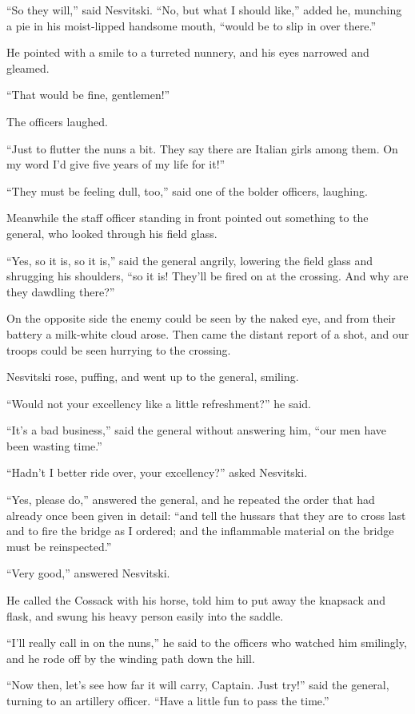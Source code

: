 ``So they will,'' said Nesvitski. ``No, but what I should like,''
added he, munching a pie in his moist-lipped handsome mouth,
``would be to slip in over there.''

He pointed with a smile to a turreted nunnery, and his eyes
narrowed and gleamed.

``That would be fine, gentlemen!''

The officers laughed.

``Just to flutter the nuns a bit. They say there are Italian
girls among them. On my word I'd give five years of my life for
it!''

``They must be feeling dull, too,'' said one of the bolder
officers, laughing.

Meanwhile the staff officer standing in front pointed out
something to the general, who looked through his field glass.

``Yes, so it is, so it is,'' said the general angrily, lowering
the field glass and shrugging his shoulders, ``so it is! They'll
be fired on at the crossing. And why are they dawdling there?''

On the opposite side the enemy could be seen by the naked eye,
and from their battery a milk-white cloud arose. Then came the
distant report of a shot, and our troops could be seen hurrying
to the crossing.

Nesvitski rose, puffing, and went up to the general, smiling.

``Would not your excellency like a little refreshment?'' he said.

``It's a bad business,'' said the general without answering him,
``our men have been wasting time.''

``Hadn't I better ride over, your excellency?'' asked Nesvitski.

``Yes, please do,'' answered the general, and he repeated the
order that had already once been given in detail: ``and tell the
hussars that they are to cross last and to fire the bridge as I
ordered; and the inflammable material on the bridge must be
reinspected.''

``Very good,'' answered Nesvitski.

He called the Cossack with his horse, told him to put away the
knapsack and flask, and swung his heavy person easily into the
saddle.

``I'll really call in on the nuns,'' he said to the officers who
watched him smilingly, and he rode off by the winding path down
the hill.

``Now then, let's see how far it will carry, Captain. Just try!''
said the general, turning to an artillery officer. ``Have a
little fun to pass the time.''

